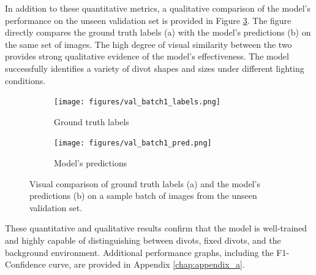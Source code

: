 In addition to these quantitative metrics, a qualitative comparison of the model's performance on the unseen validation set is provided in Figure \ref{fig:validation_comparison}. The figure directly compares the ground truth labels (a) with the model's predictions (b) on the same set of images. The high degree of visual similarity between the two provides strong qualitative evidence of the model's effectiveness. The model successfully identifies a variety of divot shapes and sizes under different lighting conditions.

\begin{figure}[h!]
    \centering
    \begin{subfigure}[b]{0.49\textwidth}
        \centering
        \texttt{[image: figures/val\_batch1\_labels.png]}
        \caption{Ground truth labels}
        \label{fig:val_labels}
    \end{subfigure}
    \hfill %
    \begin{subfigure}[b]{0.49\textwidth}
        \centering
        \texttt{[image: figures/val\_batch1\_pred.png]}
        \caption{Model's predictions}
        \label{fig:val_preds}
    \end{subfigure}
    \caption{Visual comparison of ground truth labels (a) and the model's predictions (b) on a sample batch of images from the unseen validation set.}
    \label{fig:validation_comparison}
\end{figure}

These quantitative and qualitative results confirm that the model is well-trained and highly capable of distinguishing between divots, fixed divots, and the background environment. Additional performance graphs, including the F1-Confidence curve, are provided in Appendix \ref{chap:appendix_a}.



